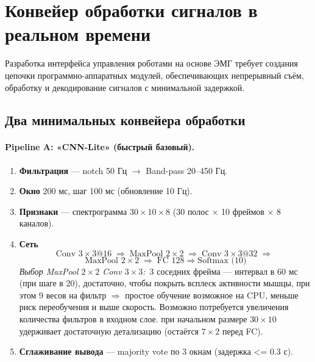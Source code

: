 \documentclass[12pt,a4paper]{article}
\begin{document}
\section{Конвейер обработки сигналов в реальном времени}
Разработка интерфейса управления роботами на основе ЭМГ требует создания цепочки программно-аппаратных модулей, обеспечивающих непрерывный съём, обработку и декодирование сигналов с минимальной задержкой.

\subsection{Два минимальных конвейера обработки}

\paragraph{Pipeline A: «CNN-Lite» (быстрый базовый).}
\begin{enumerate}
  \item \textbf{Фильтрация} — notch 50 Гц $\to$ Band-pass 20–450 Гц.
  \item \textbf{Окно} 200 мс, шаг 100 мс  (обновление 10 Гц).
  \item \textbf{Признаки} — спектрограмма  
        $30{\times}10{\times}8$ (30 полос $\times$ 10 фреймов $\times$ 8 каналов).
  \item \textbf{Сеть}  
        \[
        \text{Conv }3{\times}3@16 \;\Rightarrow\; \boxed{\text{MaxPool }2{\times}2}\;
        \Rightarrow\; \text{Conv }3{\times}3@32 \;\Rightarrow\; \]
            \[
        \boxed{\text{MaxPool }2{\times}2}\;
        \Rightarrow\; \text{FC 128} \Rightarrow \text{Softmax (10)}
        \]
        \textit{Выбор MaxPool $2{\times}2$ Conv $3{\times}3$:}\,  
        3 соседних фрейма — интервал в 60 мс (при шаге в 20), достаточно, чтобы покрыть всплеск активности мышцы, при этом 9 весов на фильтр $\Rightarrow$ простое обучение возможное на CPU,
        меньше риск переобучения и выше скорость. Возможно потребуется увеличения количества фильтров в входном слое.
        при начальном размере $30{\times}10$ удерживает
        достаточную детализацию (остаётся $7{\times}2$ перед FC).
  \item \textbf{Сглаживание вывода} — majority vote по 3 окнам (задержка <= 0.3 с).
\end{enumerate}

\vspace{0.8em}
\end{document}
